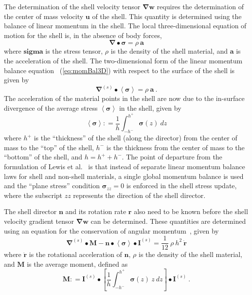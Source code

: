   The determination of the shell velocity tensor 
  $\boldsymbol{\nabla}\mathbf{w}$ requires the determination of the 
  center of mass velocity $\mathbf{u}$ of the shell.  This quantity is
  determined using the balance of linear momentum in the shell.
  The local three-dimensional equation of motion for the shell is, in the
  absence of body forces,
  \begin{equation}
    \boldsymbol{\nabla}\bullet\boldsymbol{\sigma} = \rho~\mathbf{a}
    \label{eq:momBal3D}
  \end{equation}
  where $\mathbf{sigma}$ is the stress tensor, $\rho$ is the density of
  the shell material, and $\mathbf{a}$ is the acceleration of the shell.
  The two-dimensional form of the linear momentum balance equation
  ~(\ref{eq:momBal3D}) with respect to the surface of the shell is
  given by
  \begin{equation}
    \boldsymbol{\nabla}^{(s)}\bullet \left<\boldsymbol{\sigma}\right> 
     = \rho~\mathbf{a}~.
    \label{eq:momBal2D}
  \end{equation}
  The acceleration of the material points in the shell are now due to
  the in-surface divergence of the average stress 
  $\left<\boldsymbol{\sigma}\right>$ in the shell, given by
  \begin{equation}
    \left<\boldsymbol{\sigma}\right> \colon= 
      \frac{1}{h}\int^{h^+}_{-h^-} \boldsymbol{\sigma}(z)~dz
    \label{eq:avStress}
  \end{equation}
  where $h^+$ is the ``thickness'' of the shell (along the director) from
  the center of mass to the ``top'' of the shell, $h^-$ is the thickness
  from the center of mass to the ``bottom'' of the shell, and $h = h^+ + h^-$.  
  The point of departure from the formulation of Lewis et al.~\cite{Lewis1998} 
  is that instead of separate linear momentum balance laws for shell and 
  non-shell materials, a single global momentum balance is used and the 
  ``plane stress'' condition $\mathbf{\sigma}_{zz} = 0$ is enforced in the 
  shell stress update, where the subscript $zz$ represents the direction of 
  the shell director.  
  
  The shell director $\mathbf{n}$ and its rotation rate $\mathbf{r}$ also need
  to be known before the shell velocity gradient tensor 
  $\boldsymbol{\nabla}\mathbf{w}$ can be determined.  These quantities
  are determined using an equation for the conservation of angular 
  momentum~\cite{Schreyer1997}, given by
  \begin{equation}
    \boldsymbol{\nabla}^{(s)}\bullet\mathbf{M} - 
      \mathbf{n}\bullet\left<\boldsymbol{\sigma}\right>\bullet\mathbf{I}^{(s)}
    = \frac{1}{12}~\rho~h^2~\dot{\mathbf{r}}
    \label{eq:rotInertia}
  \end{equation}
  where $\dot{\mathbf{r}}$ is the rotational acceleration of $\mathbf{n}$,
  $\rho$ is the density of the shell material, and $\mathbf{M}$ is the 
  average moment, defined as
  \begin{equation}
    \mathbf{M} \colon= \mathbf{I}^{(s)}\bullet
                 \left[ \frac{1}{h}\int^{h^+}_{-h^-}\boldsymbol{\sigma}(z)~z~dz
                 \right]\bullet \mathbf{I}^{(s)}~.
    \label{eq:avMoment}
  \end{equation}


